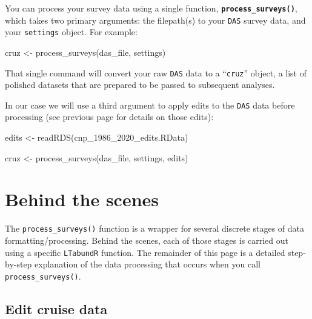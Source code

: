 \documentclass[
]{book}
\newenvironment{Shaded}{\begin{snugshade}}{\end{snugshade}}
\newcommand{\FunctionTok}[1]{\textcolor[rgb]{0.00,0.00,0.00}{#1}}
\newcommand{\NormalTok}[1]{#1}
\newcommand{\OtherTok}[1]{\textcolor[rgb]{0.56,0.35,0.01}{#1}}
\newcommand{\StringTok}[1]{\textcolor[rgb]{0.31,0.60,0.02}{#1}}
\begin{document}
You can process your survey data using a single function, \textbf{\texttt{process\_surveys()}}, which takes two primary arguments: the filepath(s) to your \texttt{DAS} survey data, and your \texttt{settings} object. For example:

\begin{Shaded}
\begin{Highlighting}[]
\NormalTok{cruz }\OtherTok{\textless{}{-}} \FunctionTok{process\_surveys}\NormalTok{(das\_file, }
\NormalTok{                        settings)}
\end{Highlighting}
\end{Shaded}

That single command will convert your raw \texttt{DAS} data to a ``\texttt{cruz}'' object, a list of polished datasets that are prepared to be passed to subsequent analyses.

In our case we will use a third argument to apply edits to the \texttt{DAS} data before processing (see previous page for details on those edits):

\begin{Shaded}
\begin{Highlighting}[]
\NormalTok{edits }\OtherTok{\textless{}{-}} \FunctionTok{readRDS}\NormalTok{(}\StringTok{\textquotesingle{}cnp\_1986\_2020\_edits.RData\textquotesingle{}}\NormalTok{)}

\NormalTok{cruz }\OtherTok{\textless{}{-}} \FunctionTok{process\_surveys}\NormalTok{(das\_file, }
\NormalTok{                        settings,}
\NormalTok{                        edits)}
\end{Highlighting}
\end{Shaded}

\hypertarget{behind-the-scenes}{%
\section*{Behind the scenes}\label{behind-the-scenes}}

The \texttt{process\_surveys()} function is a wrapper for several discrete stages of data formatting/processing. Behind the scenes, each of those stages is carried out using a specific \texttt{LTabundR} function. The remainder of this page is a detailed step-by-step explanation of the data processing that occurs when you call \texttt{process\_surveys()}.

\hypertarget{edit-cruise-data}{%
\subsection*{Edit cruise data}\label{edit-cruise-data}}
\end{document}
